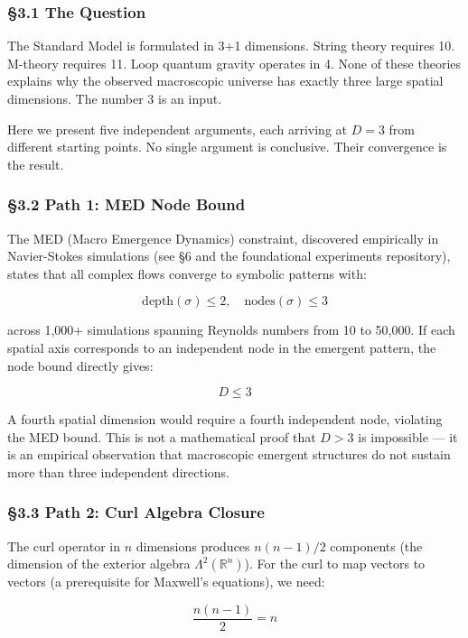 \documentclass[
  11pt,
  a4paper]{article}
\begin{document}
\subsubsection{§3.1 The Question}\label{the-question}

The Standard Model is formulated in 3+1 dimensions. String theory
requires 10. M-theory requires 11. Loop quantum gravity operates in 4.
None of these theories explains why the observed macroscopic universe
has exactly three large spatial dimensions. The number 3 is an input.

Here we present five independent arguments, each arriving at \(D = 3\)
from different starting points. No single argument is conclusive. Their
convergence is the result.

\subsubsection{§3.2 Path 1: MED Node Bound}\label{path-1-med-node-bound}

The MED (Macro Emergence Dynamics) constraint, discovered empirically in
Navier-Stokes simulations (see §6 and the foundational experiments
repository), states that all complex flows converge to symbolic patterns
with:

\[\text{depth}(\sigma) \leq 2, \quad \text{nodes}(\sigma) \leq 3\]

across 1,000+ simulations spanning Reynolds numbers from 10 to 50,000.
If each spatial axis corresponds to an independent node in the emergent
pattern, the node bound directly gives:

\[D \leq 3\]

A fourth spatial dimension would require a fourth independent node,
violating the MED bound. This is not a mathematical proof that \(D > 3\)
is impossible --- it is an empirical observation that macroscopic
emergent structures do not sustain more than three independent
directions.

\subsubsection{§3.3 Path 2: Curl Algebra
Closure}\label{path-2-curl-algebra-closure}

The curl operator in \(n\) dimensions produces \(n(n-1)/2\) components
(the dimension of the exterior algebra \(\Lambda^2(\mathbb{R}^n)\)). For
the curl to map vectors to vectors (a prerequisite for Maxwell's
equations), we need:

\[\frac{n(n-1)}{2} = n\]
\end{document}
